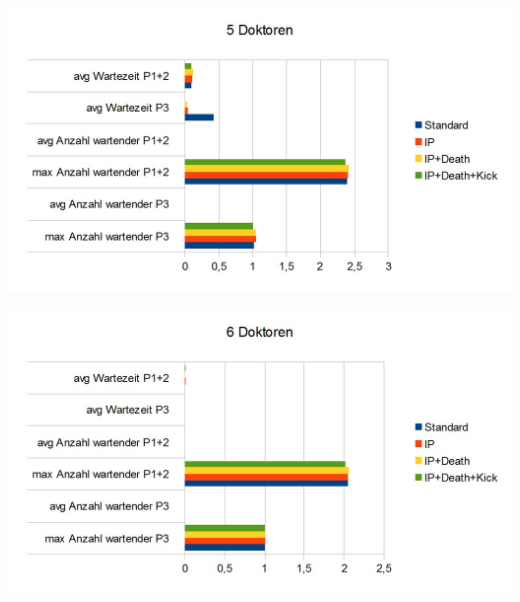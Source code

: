 \documentclass{beamer}
\begin{document}
\begin{frame}
	\includegraphics[scale=0.4]{img/5Doktoren.jpg}
\end{frame}

\begin{frame}
	\includegraphics[scale=0.4]{img/6Doktoren.jpg}
\end{frame}
\end{document}
